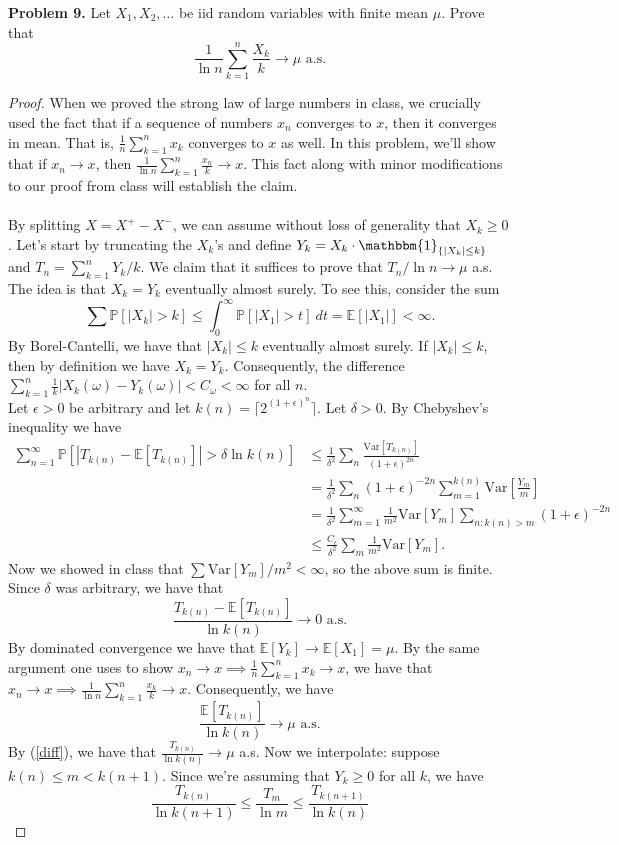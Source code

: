 \documentclass[11pt,letterpaper]{report}
\newcommand{\E}{\mathbb{E}}
\newcommand{\Prob}{\mathbb{P}}
\newcommand{\Var}{\text{Var}}
\newcommand{\ind}{\mathbbm{1}}
\begin{document}
\noindent\textbf{Problem 9. }
Let $X_1, X_2, \ldots$ be iid random variables with finite mean $\mu$. Prove that
\[
\frac{1}{\ln n}\sum_{k=1}^n\frac{X_k}{k}\to \mu\text{ a.s.}
\]
\begin{proof}
	When we proved the strong law of large numbers in class, we crucially used the fact that if a sequence of numbers $x_n$ converges to $x$, then it converges in mean. That is, $\frac{1}{n}\sum_{k=1}^n x_k$ converges to $x$ as well. In this problem, we'll show that if $x_n\to x$, then $\frac{1}{\ln n}\sum_{k=1}^n \frac{x_n}{k}\to x$. This fact along with minor modifications to our proof from class will establish the claim.\\
	\noindent \\
	\noindent By splitting $X = X^+ - X^-$, we can assume without loss of generality that $X_k \geq 0$. Let's start by truncating the $X_k$'s and define $Y_k = X_k\cdot \ind_{\{|X_k|\leq k\}}$ and $T_n = \sum_{k=1}^n Y_k/k$. We claim that it suffices to prove that $T_n/\ln n \to \mu $ a.s. The idea is that $X_k = Y_k$ eventually almost surely. To see this, consider the sum
	\[
	\sum \Prob[|X_k| > k] \leq \int_0^\infty \Prob[|X_1|>t]\ dt = \E[|X_1|]<\infty.
	\]
	By Borel-Cantelli, we have that $|X_k|\leq k$ eventually almost surely. If $|X_k|\leq k$, then by definition we have $X_k = Y_k$. Consequently, the difference $\sum_{k=1}^n \frac{1}{k}|X_k(\omega) - Y_k(\omega)|<C_\omega<\infty$ for all $n$.\\

	\noindent Let $\epsilon>0$ be arbitrary and let $k(n) = \lceil 2^{(1+\epsilon)^n}\rceil$. Let $\delta>0$. By Chebyshev's inequality we have
	\begin{align*}
		\sum_{n = 1}^\infty \Prob[|T_{k(n)} - \E[T_{k(n)}]| > \delta \ln k(n)] &\leq \frac{1}{\delta^2}\sum_n \frac{\Var[T_{k(n)}]}{(1+\epsilon)^{2n}}\\
		&= \frac{1}{\delta^2}\sum_n (1+\epsilon)^{-2n}\sum_{m = 1}^{k(n)}\Var\left[\frac{Y_m}{m}\right]\\
		&= \frac{1}{\delta^2}\sum_{m=1}^\infty \frac{1}{m^2}\Var[Y_m]\sum_{n: k(n)>m}(1+\epsilon)^{-2n}\\
		&\leq \frac{C_\epsilon}{\delta^2}\sum_m\frac{1}{m^2}\Var[Y_m].
	\end{align*}
	Now we showed in class that $\sum \Var[Y_m]/m^2<\infty$, so the above sum is finite. Since $\delta$ was arbitrary, we have that
	\begin{equation}\label{diff}
	\frac{T_{k(n)} - \E[T_{k(n)}]}{\ln k(n)}\to 0\text{ a.s.}
	\end{equation}
	By dominated convergence we have that $\E[Y_k] \to \E[X_1] = \mu$. By the same argument one uses to show $x_n\to x \implies \frac{1}{n}\sum_{k=1}^n x_k \to x$, we have that $x_n\to x \implies \frac{1}{\ln n}\sum_{k=1}^n \frac{x_k}{k}\to x$. Consequently, we have
	\[
	\frac{\E[T_{k(n)}]}{\ln k(n)} \to \mu\text{ a.s.}
	\]
	By (\ref{diff}), we have that $\frac{T_{k(n)}}{\ln k(n)}\to \mu$ a.s. Now we interpolate: suppose $k(n)\leq m< k(n+1)$. Since we're assuming that $Y_k\geq 0$ for all $k$, we have
	\[
	\frac{T_{k(n)}}{\ln k(n+1)}\leq \frac{T_m}{\ln m}\leq \frac{T_{k(n+1)}}{\ln k(n)}
	\]
\end{proof}
\end{document}
